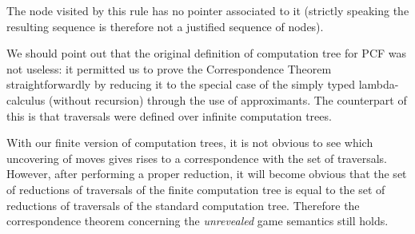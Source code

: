 \documentclass{article}
\begin{document}
The node visited by this rule has no pointer associated to it (strictly speaking the resulting sequence is therefore not a justified sequence of nodes).




We should point out that the original definition of computation tree for PCF was not useless: it permitted us to prove the Correspondence Theorem straightforwardly by reducing it to the special case of the simply typed lambda-calculus (without recursion) through the use of approximants. 
The counterpart of this is that traversals were defined over infinite computation trees.

With our finite version of computation trees, it is not obvious to see which uncovering of moves gives rises to a correspondence with the set of traversals.
However, after performing a proper reduction, it will become obvious that the set of reductions of traversals of the finite computation tree is equal to the set of reductions of 
traversals of the standard computation tree.
Therefore the correspondence theorem concerning the \emph{unrevealed} game semantics still holds.
\end{document}
